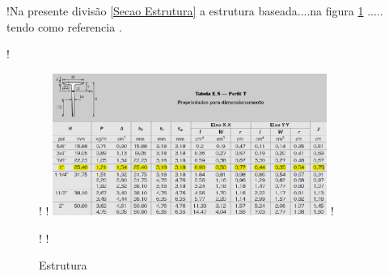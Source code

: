 !Na presente divisão \ref{Secao Estrutura}  a estrutura baseada....na figura \ref{fig:awesome_image} ..... tendo como referencia \cite{shigley2011shigley}.

!\begin{figure}[h]
!   \centering
!   \includegraphics[width=0.8\textwidth]{figuras/perfil_t.png}
!   \caption{Estrutura}
!   \label{fig:awesome_image}
!\end{figure}
